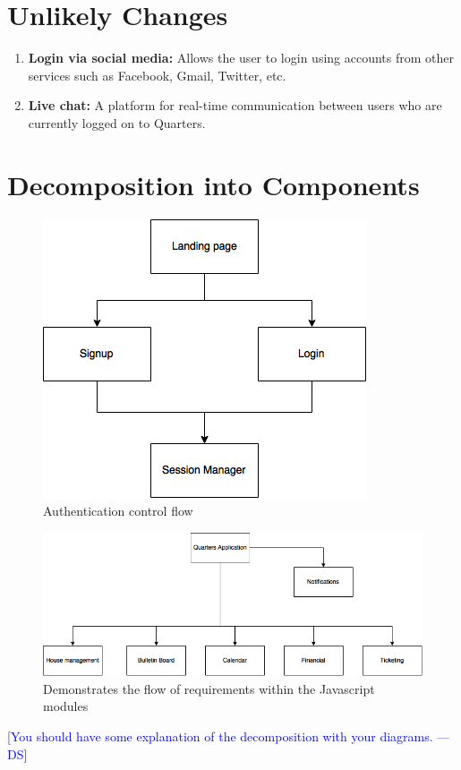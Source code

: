 \documentclass[12pt]{article}
\newcommand{\authornote}[3]{\textcolor{#1}{[#3 ---#2]}}
\newcommand{\authornote}[3]{}
\newcommand{\ds}[1]{\authornote{blue}{DS}{#1}}
\begin{document}
\section{Unlikely Changes}
\begin{enumerate}
  \item \textbf{Login via social media:} Allows the user to login using accounts from other services such as Facebook, Gmail, Twitter, etc.
  \item \textbf{Live chat:} A platform for real-time communication between users who are currently logged on to Quarters.
\end{enumerate}

%
\section{Decomposition into Components}
\begin{figure}
\centering
\includegraphics[scale=0.75]{login}
\caption{Authentication control flow}
\label{fig:jsflow}
\end{figure}

\begin{figure}
\centering
\includegraphics[width=\textwidth]{quarters}
\caption{Demonstrates the flow of requirements within the Javascript modules}
\label{fig:jsflow}
\end{figure}

\ds{You should have some explanation of the decomposition with your diagrams.}
\end{document}
